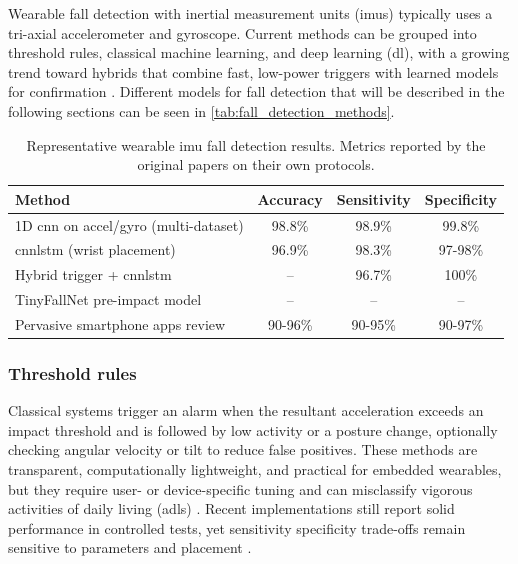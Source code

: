 Wearable fall detection with inertial measurement units (\gls{imu}s) typically uses a tri-axial accelerometer and gyroscope. Current methods can be grouped into threshold rules, classical machine learning, and deep learning (\gls{dl}), with a growing trend toward hybrids that combine fast, low-power triggers with learned models for confirmation \cite{Zhang2024_JMIR,Garcia2022_Neurocomputing,Hu2025_BSPC}. Different models for fall detection that will be described in the following sections can be seen in  \autoref{tab:fall_detection_methods}.

\begin{table}[H]
\centering
\begin{tabular}{lccc}
\hline
Method & Accuracy & Sensitivity & Specificity \\
\hline
1D \gls{cnn} on accel/gyro (multi-dataset)\cite{Zhang2024_JMIR} & 98.8\% & 98.9\% & 99.8\% \\
\gls{cnnlstm} (wrist placement)\cite{Garcia2022_Neurocomputing} & 96.9\% & 98.3\% & 97-98\% \\
Hybrid trigger + \gls{cnnlstm} \cite{Hu2025_BSPC} & -- & 96.7\% & 100\% \\
TinyFallNet pre-impact model \cite{TinyFallNet2023_Sensors} & -- & -- & -- \\
Pervasive smartphone apps review \cite{Stampfler2022_PervasiveAppsReview} & 90-96\% & 90-95\% & 90-97\% \\
\hline
\end{tabular}
\caption{Representative wearable \gls{imu} fall detection results. Metrics reported by the original papers on their own protocols.}
\label{tab:fall_detection_methods}
\end{table}

\subsubsection{Threshold rules}
Classical systems trigger an alarm when the resultant acceleration exceeds an impact threshold and is followed by low activity or a posture change, optionally checking angular velocity or tilt to reduce false positives. These methods are transparent, computationally lightweight, and practical for embedded wearables, but they require user- or device-specific tuning and can misclassify vigorous activities of daily living (\gls{adl}s) \cite{Stampfler2022_PervasiveAppsReview}. Recent implementations still report solid performance in controlled tests, yet sensitivity specificity trade-offs remain sensitive to parameters and placement \cite{lee_development_2019}.


